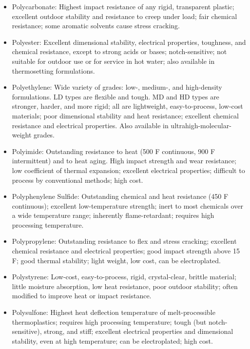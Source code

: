 \documentclass[
10pt,
a4paper,
openany,
svgnames,
]{book}
\begin{document}
\begin{itemize}[label=\scriptsize$\square$]
\item Polycarbonate: Highest impact resistance of any rigid, transparent plastic; excellent outdoor stability and resistance to creep under load; fair chemical resistance; some aromatic solvents cause stress cracking.

\item Polyester: Excellent dimensional stability, electrical properties, toughness, and chemical resistance, except to strong acids or bases; notch-sensitive; not suitable for outdoor use or for service in hot water; also available in thermosetting formulations.

\item Polyethylene: Wide variety of grades: low-, medium-, and high-density formulations. LD types are flexible and tough. MD and HD types are stronger, harder, and more rigid; all are lightweight, easy-to-process, low-cost materials; poor dimensional stability and heat resistance; excellent chemical resistance and electrical properties. Also available in ultrahigh-molecular-weight grades.

\item Polyimide: Outstanding resistance to heat (500 F continuous, 900 F intermittent) and to heat aging. High impact strength and wear resistance; low coefficient of thermal expansion; excellent electrical properties; difficult to process by conventional methods; high cost.

\item Polyphenylene Sulfide: Outstanding chemical and heat resistance (450 F continuous); excellent low-temperature strength; inert to most chemicals over a wide temperature range; inherently flame-retardant; requires high processing temperature.

\item Polypropylene: Outstanding resistance to flex and stress cracking; excellent chemical resistance and electrical properties; good impact strength above 15 F; good thermal stability; light weight, low cost, can be electroplated.

\item Polystyrene: Low-cost, easy-to-process, rigid, crystal-clear, brittle material; little moisture absorption, low heat resistance, poor outdoor stability; often modified to improve heat or impact resistance.

\item Polysulfone: Highest heat deflection temperature of melt-processible thermoplastics; requires high processing temperature; tough (but notch-sensitive), strong, and stiff; excellent electrical properties and dimensional stability, even at high temperature; can be electroplated; high cost.


\end{itemize}
\end{document}

